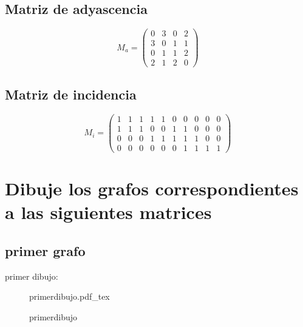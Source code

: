 \documentclass[10pt,a4paper]{article} %
\newcommand{\incfig}[1]{%
    \def\svgwidth{\columnwidth}
    {#1.pdf_tex}
}
\begin{document}
        \subsection{Matriz de adyascencia}
            \begin{equation}
                M_a = \begin{pmatrix}
                    0 & 3 & 0 & 2
                  \\3 & 0 & 1 & 1
                  \\0 & 1 & 1 & 2
                  \\2 & 1 & 2 & 0
                \end{pmatrix}
            \end{equation}
        \subsection{Matriz de incidencia}
            \begin{equation}
                M_i = \begin{pmatrix}
                     1 & 1 & 1 & 1 & 1 & 0 & 0 & 0 & 0 & 0
                    \\1 & 1 & 1 & 0 & 0 & 1 & 1 & 0 & 0 & 0
                    \\0 & 0 & 0 & 1 & 1 & 1 & 1 & 1 & 0 & 0
                    \\0 & 0 & 0 & 0 & 0 & 0 & 1 & 1 & 1 & 1
                \end{pmatrix}
            \end{equation}
    \section{Dibuje los grafos correspondientes a las siguientes matrices}
        \subsection{primer grafo}
            primer dibujo:
            \\
            \begin{figure}[h]
                \centering
                \incfig{primerdibujo}
                \caption{primerdibujo}
                \label{fig:grafo de la matriz}
            \end{figure}
\end{document}
